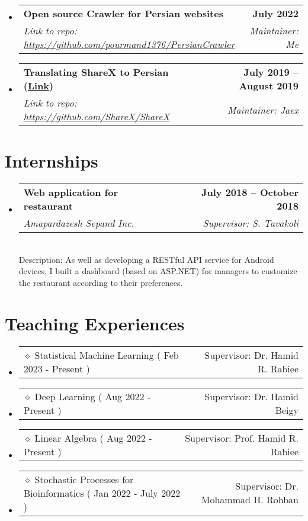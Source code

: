 \documentclass[letterpaper,11pt]{article}
\makeatletter
\newcommand{\resumeSubheading}[4]{
  \vspace{-2pt}\item
    \begin{tabular*}{1.0\textwidth}[t]{l@{\extracolsep{\fill}}r}
      \textbf{#1} & \textbf{\small #2} \\
    \textcolor{sgray} {\textit{\small#3}} & \textcolor{sgray}{ \textit{\small #4} }\\
    \end{tabular*}\vspace{-7pt}
}
\newcommand{\resumeSubheadingSmall}[4]{
	\item
	\begin{tabular*}{1.0\textwidth}[t]{l@{\extracolsep{\fill}}r} 
	$\diamond$ \hspace{1mm}	#1 (#2) & #4 \\
	\end{tabular*}\vspace{-7pt}
}
\newcommand{\resumeSubheadingD}[5]{
  \vspace{-2pt}\item
    \begin{tabular*}{1.0\textwidth}[t]{l@{\extracolsep{\fill}}r}
      \textbf{#1} & \textbf{\small #2} \\
    \textcolor{sgray} {\textit{\small#3}} & \textcolor{sgray}{ \textit{\small #4} }\\
    \end{tabular*} %
    \\ \vspace{3pt}
    Description:{#5}
}
\newcommand{\resumeSubHeadingListStart}{\begin{itemize}[leftmargin=0.0in, label={}]}
\newcommand{\resumeSubHeadingListEnd}{\end{itemize}}
\makeatother
\begin{document}
    \resumeSubHeadingListStart
  \resumeSubheading
  {Open source Crawler for Persian websites}{July 2022}
  {Link to repo: \url{https://github.com/pourmand1376/PersianCrawler} }{Maintainer: Me}
  \resumeSubHeadingListEnd
  
  
   \resumeSubHeadingListStart
  \resumeSubheading
  {Translating ShareX to Persian (\href{https://github.com/ShareX/ShareX/pulls?q=Persian}{Link})}{July 2019 – August 2019}
  {Link to repo: \url{https://github.com/ShareX/ShareX} }{Maintainer: Jaex}
  \resumeSubHeadingListEnd
  
  
\section{Internships}

\resumeSubHeadingListStart
    \resumeSubheadingD
      {Web application for restaurant }{July 2018 – October 2018}
      {Amapardazesh Sepand Inc. }{Supervisor: S. Tavakoli}
      {
 As well as developing a RESTful API service for Android devices, I built a dashboard  (based on ASP.NET) for managers to customize the restaurant according to their preferences.
  }
  \resumeSubHeadingListEnd

\section{Teaching Experiences}

\resumeSubHeadingListStart
\resumeSubheadingSmall
{Statistical Machine Learning}{ Feb 2023 - Present }
{Sharif University of Technology} {Supervisor: Dr. Hamid R. Rabiee}
\resumeSubHeadingListEnd   

\resumeSubHeadingListStart
\resumeSubheadingSmall
{Deep Learning}{ Aug 2022 - Present }
{Sharif University of Technology} {Supervisor: Dr. Hamid Beigy}
\resumeSubHeadingListEnd   

\resumeSubHeadingListStart
\resumeSubheadingSmall
{Linear Algebra}{ Aug 2022 - Present }
{Sharif University of Technology} {Supervisor: Prof. Hamid R. Rabiee}
\resumeSubHeadingListEnd   

\resumeSubHeadingListStart
\resumeSubheadingSmall
{Stochastic Processes for Bioinformatics}{ Jan 2022 - July 2022 }
{Sharif University of Technology} {Supervisor: Dr. Mohammad H. Rohban}
\resumeSubHeadingListEnd   
\end{document}
